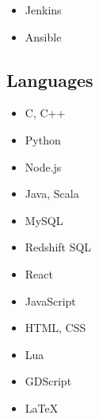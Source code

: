 \documentclass[letterpaper]{resume}
\begin{document}
\begin{minipage}[t]{0.27\textwidth}
\begin{itemize}
\item Jenkins
\item Ansible
\end{itemize}

\sectionspace %


\subsection{Languages}
\begin{itemize}
\item C, C++
\item Python
\item Node.js
\item Java, Scala
\end{itemize}

\begin{itemize}
\item MySQL
\item Redshift SQL
\end{itemize}

\begin{itemize}
\item React
\item JavaScript
\item HTML, CSS
\end{itemize}

\begin{itemize}
\item Lua
\item GDScript
\end{itemize}

\begin{itemize}
\item \LaTeX
\end{itemize}

\sectionspace %


\end{minipage} %
\hfill
%
\end{document}

